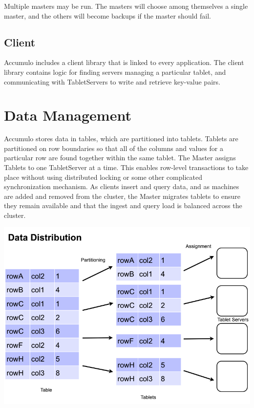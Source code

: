 Multiple masters may be run. The masters will choose among themselves a single master,
and the others will become backups if the master should fail.

\subsection{Client}

Accumulo includes a client library that is linked to every application. The client
library contains logic for finding servers managing a particular tablet, and
communicating with TabletServers to write and retrieve key-value pairs.

\section{Data Management}

Accumulo stores data in tables, which are partitioned into tablets. Tablets are
partitioned on row boundaries so that all of the columns and values for a particular
row are found together within the same tablet. The Master assigns Tablets to one
TabletServer at a time. This enables row-level transactions to take place without
using distributed locking or some other complicated synchronization mechanism. As
clients insert and query data, and as machines are added and removed from the
cluster, the Master migrates tablets to ensure they remain available and that the
ingest and query load is balanced across the cluster.

\begin{center}
\includegraphics[scale=0.4]{images/data_distribution.png}
\end{center}

